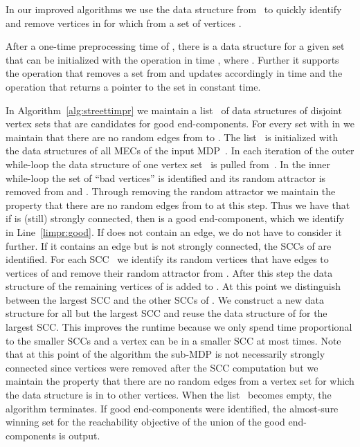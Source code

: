 \documentclass[11pt,letterpaper]{article}
\begin{document}
In our improved algorithms we use the data structure 
from~\cite{HenzingerT96} to quickly identify and remove vertices in 
 for which  from a set of vertices .
\begin{lemma}\label{lem:ds}
After a one-time preprocessing time of , there is a data structure 
 for a given set  that can be initialized with the operation 
 in time , where 
. 
Further it supports the operation  that removes 
a set  from  and updates  accordingly in 
time  and the operation 
that returns a pointer to 
the set  in constant time.
\end{lemma}

In Algorithm~\ref{alg:streettimpr} we maintain a list~ of data structures
of disjoint vertex sets that are candidates for good end-components. 
For every set  with  in  we maintain that there are no random edges 
from  to . The list~
is initialized with the data structures of all MECs of the input MDP~. 
In each iteration
of the outer while-loop the data structure of one vertex set~ is pulled 
from~. In the inner while-loop the set of ``bad vertices'' 
 is identified and its random attractor
is removed from  and . Through removing the random attractor we 
maintain the property that there are no random edges from  to 
at this step. Thus we have that if  is (still) strongly connected, then  is a good end-component, which 
we identify in Line~\ref{limpr:good}.
If  does not contain an edge, we do not have to consider it further.
If it contains an edge but is not strongly connected, the SCCs of 
are identified. For each SCC~ we identify its random vertices that have edges 
to vertices of  and remove their random attractor from .
After this step the data structure of the remaining vertices of  is added to .
At this point we distinguish between the largest SCC and the other SCCs of .
We construct a new data structure for all but the largest SCC and reuse the 
data structure of  for the largest SCC. This improves the runtime because
we only spend time proportional to the smaller SCCs and a vertex can be in a 
smaller SCC at most  times. Note that at this point of the algorithm
the sub-MDP  is not necessarily strongly connected since vertices were
removed after the SCC computation
but we maintain the property that there are no random edges from a vertex
set for which the data structure is in  to other vertices.
When the list~ becomes empty, the algorithm terminates. If good end-components
were identified, the almost-sure winning set for the reachability objective
of the union of the good end-components is output.
\end{document}
